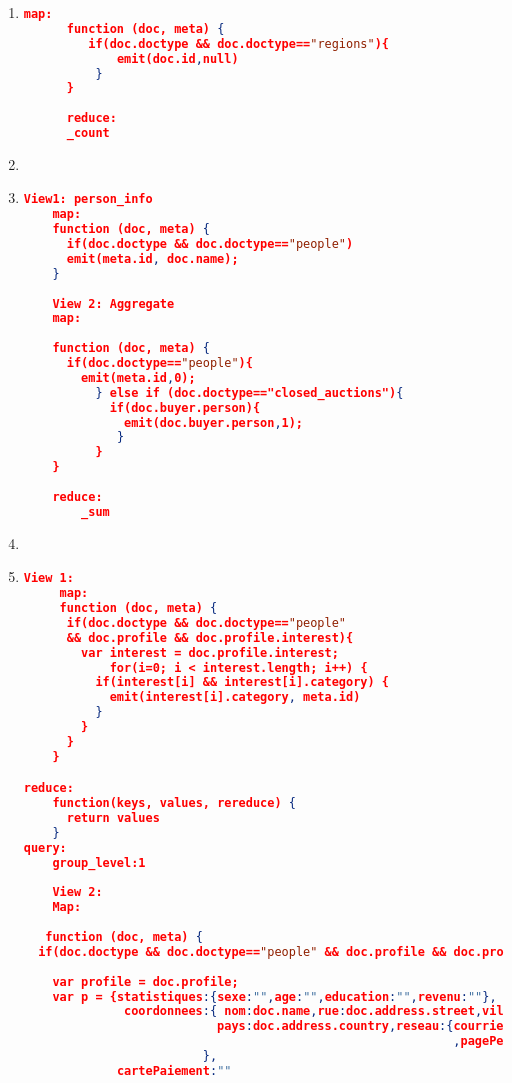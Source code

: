 \begin{enumerate}[label=Q\arabic*]
    \item \label{cb-q-6}%
	\begin{lstlisting}[language=JSON, basicstyle=\scriptsize]
	  map:
	  function (doc, meta) {
	     if(doc.doctype && doc.doctype=="regions"){
	         emit(doc.id,null)
	      }
	  }
	  
	  reduce: 
	  _count
	\end{lstlisting}
	
	
    \item \label{cb-q-7}%
    \par
	
	
    \item \label{cb-q-8}%
	\begin{lstlisting}[language=JSON, basicstyle=\scriptsize]
	View1: person_info
	map:
	function (doc, meta) {
      if(doc.doctype && doc.doctype=="people")
      emit(meta.id, doc.name);
    }
    
    View 2: Aggregate
    map:
    
    function (doc, meta) {
      if(doc.doctype=="people"){
        emit(meta.id,0);
          } else if (doc.doctype=="closed_auctions"){
            if(doc.buyer.person){
              emit(doc.buyer.person,1);
             }
          }
    }
    
    reduce: 
        _sum
	\end{lstlisting}
	
	
    \item \label{cb-q-9}%
\par
	
	
    \item \label{cb-q-10}%
	\begin{lstlisting}[language=JSON, basicstyle=\scriptsize]
	  View 1: 
	 map:
	 function (doc, meta) {
      if(doc.doctype && doc.doctype=="people" 
      && doc.profile && doc.profile.interest){
        var interest = doc.profile.interest;
            for(i=0; i < interest.length; i++) {
          if(interest[i] && interest[i].category) {
            emit(interest[i].category, meta.id) 
          }
        }
      }
    }

reduce:
    function(keys, values, rereduce) {
      return values
    }
query:
    group_level:1
	   
    View 2: 
    Map: 
    
   function (doc, meta) {
  if(doc.doctype && doc.doctype=="people" && doc.profile && doc.profile.interest){
  
    var profile = doc.profile;
    var p = {statistiques:{sexe:"",age:"",education:"",revenu:""},
              coordonnees:{ nom:doc.name,rue:doc.address.street,ville:doc.address.city,
                           pays:doc.address.country,reseau:{courrier:doc.emailaddress
                                                            ,pagePerso:doc.homepage}
                         },
             cartePaiement:""
            

\end{lstlisting}
\end{enumerate}
